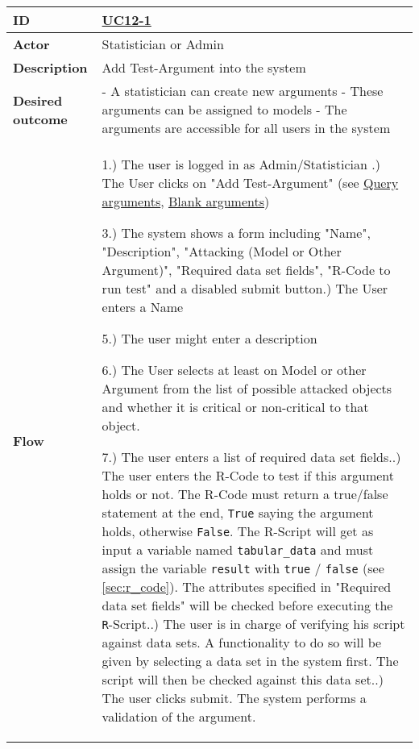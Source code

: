\begin{table}[h]
	\tiny{
		\begin{tabular}{|p{1.5cm} p{11.5cm}|}
			\hline
				\textbf{ID} & 
					\href{https://trello.com/c/2V6Cl65u}{UC12-1}\\
				
				\hline
				\textbf{Actor} & Statistician or Admin \\
				\hline
				\textbf{Description} & 
					Add Test-Argument into the system\\
				\hline
				\textbf{Desired outcome} & 
					- A statistician can create new arguments \newline
					- These arguments can be assigned to models \newline
					- The arguments are accessible for all users in the system \newline
			\\
			\hline
				\textbf{Flow} & 
					1.) The user is logged in as Admin/Statistician  \newline
					2.) The User clicks on "Add Test-Argument" (see \href{https://trello.com/c/OwM2Z7wt}{Query arguments}, \href{https://trello.com/c/Rg6GPnNE/39-uc12-5-add-attacks-between-arguments}{Blank arguments})\newline
	
				3.) The system shows a form including "Name", "Description", "Attacking (Model or Other Argument)", "Required data set fields", "R-Code to run test" and a disabled submit button\newline
					4.) The User enters a Name\newline
	
				5.) The user might enter a description\newline
	
				6.) The User selects at least on Model or other Argument from the list of possible attacked objects and whether it is critical or non-critical to that object.\newline
	
				7.) The user enters a list of required data set fields.\newline
					8.) The user enters the R-Code to test if this argument holds or not. The R-Code must return a true/false statement at the end, \texttt{True} saying the argument holds, otherwise \texttt{False}. The R-Script will get as input a variable named \texttt{tabular\_data}  and must assign the variable \texttt{result} with \texttt{true} / \texttt{false} (see \autoref{sec:r_code}). The attributes specified in "Required data set fields" will be checked before executing the \texttt{R}-Script.\newline
					9.) The user is in charge of verifying his script against data sets. A functionality to do so will be given by selecting a data set in the system first. The script will then be checked against this data set.\newline
					10.) The user clicks submit. The system performs a validation of the argument.\newline
	

\end{tabular}}
\end{table}
